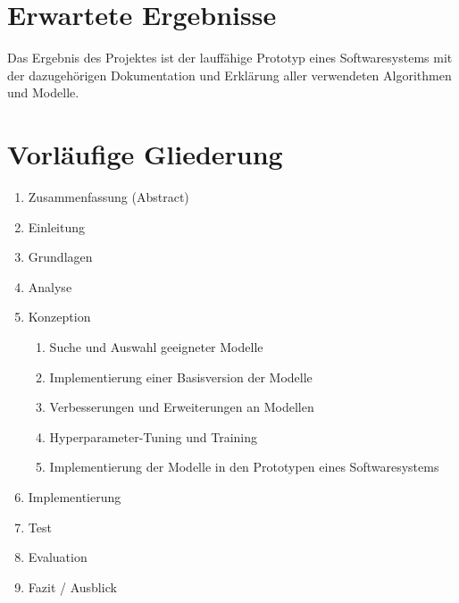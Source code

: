 \section{Erwartete Ergebnisse}
Das Ergebnis des Projektes ist der lauffähige Prototyp eines Softwaresystems mit der dazugehörigen Dokumentation und Erklärung
aller verwendeten Algorithmen und Modelle.

\pagebreak

\section{Vorläufige Gliederung}

\begin{enumerate}
	\item Zusammenfassung (Abstract)
	\item Einleitung
	\item Grundlagen
	\item Analyse
	\item Konzeption
	\begin{enumerate}[label*=\arabic*.]
		\item Suche und Auswahl geeigneter Modelle
		\item Implementierung einer Basisversion der Modelle
		\item Verbesserungen und Erweiterungen an Modellen
		\item Hyperparameter-Tuning und Training
		\item Implementierung der Modelle in den Prototypen eines Softwaresystems
	\end{enumerate}
	\item Implementierung
	\item Test
	\item Evaluation
	\item Fazit / Ausblick
\end{enumerate}

\pagebreak


\printbibliography[heading=bibintoc, filter=scientific, title={Literaturangaben}]


